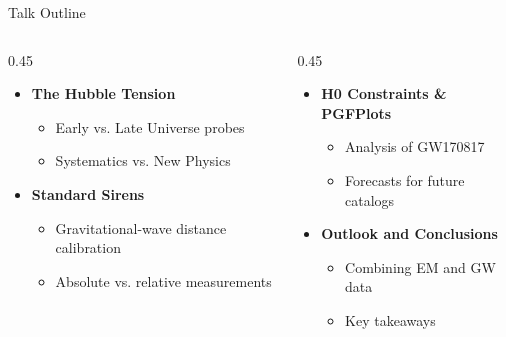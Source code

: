 \documentclass[11pt,aspectratio=169]{beamer}
\begin{document}
\begin{frame}[plain]
  \titlepage
\end{frame}

\begin{frame}{Talk Outline}
  \begin{columns}[T]
    \begin{column}{0.45\textwidth}
      \begin{itemize}
        \setlength{\itemsep}{1em}
        \item \textbf{The Hubble Tension}
        \begin{itemize}
          \item Early vs. Late Universe probes
          \item Systematics vs. New Physics
        \end{itemize}
        \item \textbf{Standard Sirens}
        \begin{itemize}
          \item Gravitational-wave distance calibration
          \item Absolute vs. relative measurements
        \end{itemize}
      \end{itemize}
    \end{column}
    \begin{column}{0.45\textwidth}
      \begin{itemize}
        \setlength{\itemsep}{1em}
        \item \textbf{H0 Constraints \& PGFPlots}
        \begin{itemize}
          \item Analysis of GW170817
          \item Forecasts for future catalogs
        \end{itemize}
        \item \textbf{Outlook and Conclusions}
        \begin{itemize}
          \item Combining EM and GW data
          \item Key takeaways
        \end{itemize}
      \end{itemize}
    \end{column}
  \end{columns}
\end{frame}





\end{document}

